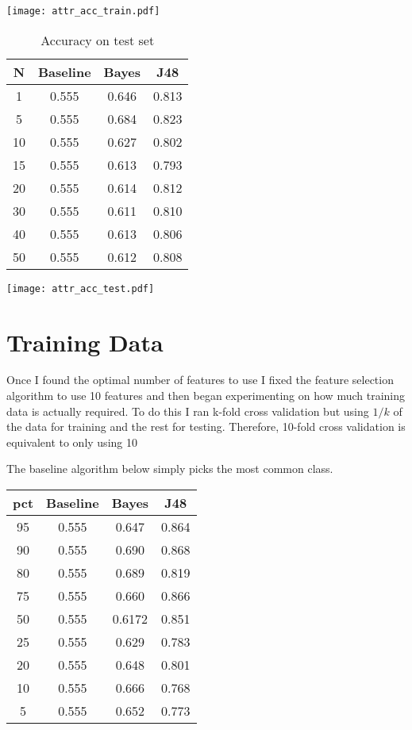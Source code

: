 \documentclass[10pt]{article}
\begin{document}
\texttt{[image: attr\_acc\_train.pdf]}

\begin{table}[h]
\begin{center}
\begin{tabular}{|c|c|c|c|}
\hline
N & Baseline & Bayes & J48 \\
 \hline\hline 
1 & 0.555 & 0.646 & 0.813 \\
5 & 0.555 & 0.684 & 0.823 \\
10 & 0.555 & 0.627 & 0.802 \\
15 & 0.555 & 0.613 & 0.793 \\
20 & 0.555 & 0.614 & 0.812 \\
30 & 0.555 & 0.611 & 0.810 \\
40 & 0.555 & 0.613 & 0.806 \\
50 & 0.555 & 0.612 & 0.808 \\
\hline
\end{tabular}
\end{center}
\caption{Accuracy on test set}
\end{table}

\texttt{[image: attr\_acc\_test.pdf]}

\section{Training Data}
Once I found the optimal number of features to use I fixed the feature 
selection algorithm to use 10 features and then began experimenting
on how much training data is actually required.  To do this I ran k-fold
cross validation but using $1/k$ of the data for training and the rest for
testing.  Therefore, 10-fold cross validation is equivalent to only using
10%

The baseline algorithm below simply picks the most common class.

\begin{table}[h]
\begin{center}
\begin{tabular}{|c|c|c|c|}
\hline
pct & Baseline & Bayes & J48 \\
 \hline\hline 
95 & 0.555 & 0.647 & 0.864 \\
90 & 0.555 & 0.690 & 0.868 \\
80 & 0.555 & 0.689 & 0.819 \\
75 & 0.555 & 0.660 & 0.866 \\
50 & 0.555 & 0.6172 & 0.851 \\
25 & 0.555 & 0.629 & 0.783 \\
20 & 0.555 & 0.648 & 0.801 \\
10 & 0.555 & 0.666 & 0.768 \\
5 & 0.555 &  0.652 & 0.773 \\
\hline
\end{tabular}
\end{center}
\end{table}
\end{document}
